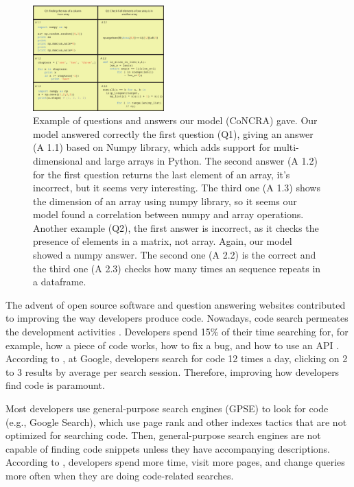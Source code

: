 \documentclass[sigconf]{acmart}
\begin{document}
\begin{figure}[h]
  \includegraphics[width=0.45\textwidth]{figuras/concrete_examples.pdf}
  \caption{Example of questions and answers our model (CoNCRA) gave. Our model answered correctly the first question (Q1), giving an answer (A 1.1) based on Numpy library, which adds support for multi-dimensional and large arrays in Python. The second answer (A 1.2) for the first question returns the last element of an array, it's incorrect, but it seems very interesting. The third one (A 1.3) shows the dimension of an array using numpy library, so it seems our model found a correlation between numpy and array operations. Another example (Q2), the first answer is incorrect, as it checks the presence of elements in a matrix, not array. Again, our model showed a numpy answer. The second one (A 2.2) is the correct and the third one (A 2.3) checks how many times an sequence repeats in a dataframe. }
  \label{fig:concrete-examples}
\end{figure}

The advent of open source software and question answering websites contributed to improving the way developers produce code. Nowadays, code search permeates the development activities \citep{towards-summarizing-source-code-search:marin:2020}. Developers spend 15\% of their time searching for, for example, how a piece of code works, how to fix a bug, and how to use an API \cite{what-developers-search-for-on-the-web:xia:2017}. According to \citet{sadowski-how-developers-search-for-code-case-study:2015}, at Google, developers search for code 12 times a day, clicking on 2 to 3 results by average per search session. Therefore, improving how developers find code is paramount.  

Most developers use general-purpose search engines (GPSE) to look for code (e.g., Google Search), which use page rank and other indexes tactics that are not optimized for searching code. Then, general-purpose search engines are not capable of finding code snippets unless they have accompanying descriptions. According to \citet{masudur-developers-use-google-code-retrieval:2018}, developers spend more time, visit more pages, and change queries more often when they are doing code-related searches.
\end{document}
